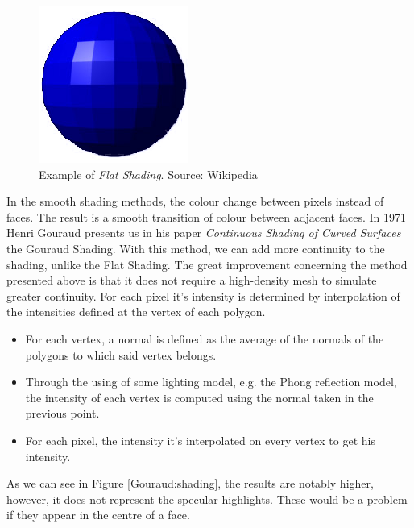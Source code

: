 \documentclass[titlepage,12pt]{report}
\begin{document}
\begin{figure}[H]
	\centering
	\includegraphics[scale=0.5]{media/Flat-shading-sample.png}
	\caption{Example of \textit{Flat Shading}. Source: Wikipedia}
	\label{flat:shading}
\end{figure}

In the smooth shading methods, the colour change between pixels instead of faces. The result is a smooth transition of colour between adjacent faces. In 1971 Henri Gouraud presents us in his paper \textit{Continuous Shading of Curved Surfaces} \citep[pp.~623--629]{Henri1971} the Gouraud Shading. With this method, we can add more continuity to the shading, unlike the Flat Shading. The great improvement concerning the method presented above is that it does not require a high-density mesh to simulate greater continuity. For each pixel it's intensity is determined by interpolation of the intensities defined at the vertex of each polygon.

\begin{itemize}
	\item For each vertex, a normal is defined as the average of the normals of the polygons to which said vertex belongs.
	\item Through the using of some lighting model,  e.g. the Phong reflection model, the intensity of each vertex is computed using the normal taken in the previous point.
	\item For each pixel, the intensity it's interpolated on every vertex to get his intensity.
\end{itemize} 

As we can see in Figure \ref{Gouraud:shading}, the results are notably higher, however, it does not represent the specular highlights. These would be a problem if they appear in the centre of a face.
\end{document}
